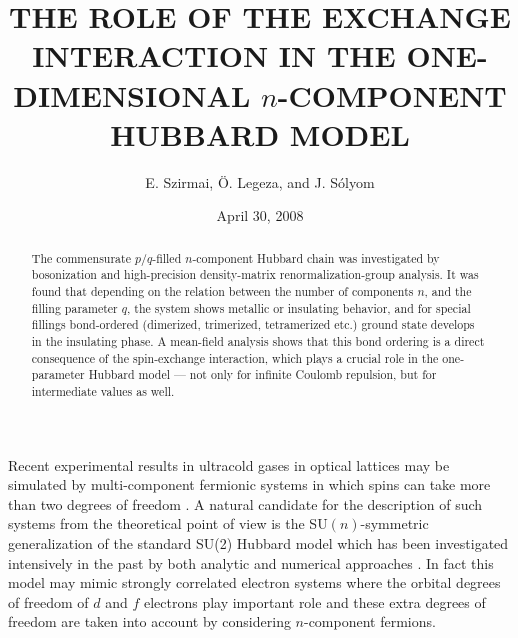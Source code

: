 \documentclass[aps,prb,twocolumn,floatfix,showpacs]{revtex4}
\begin{document}
\title{THE ROLE OF THE EXCHANGE INTERACTION IN THE ONE-DIMENSIONAL
  $n$-COMPONENT HUBBARD MODEL}

\author{E. Szirmai, \"O. Legeza, and J. S\'olyom}


\date{April 30, 2008}

    

\begin{abstract}
  The commensurate $p/q$-filled $n$-component Hubbard chain was investigated
by bosonization and high-precision density-matrix renormalization-group
analysis. It was found that depending on the relation between the number of
components $n$, and the filling parameter $q$, the system shows metallic or
insulating behavior, and for special fillings bond-ordered (dimerized,
trimerized, tetramerized etc.) ground state develops in the insulating
phase. A mean-field analysis shows
that this bond ordering is a direct consequence of the spin-exchange
interaction, which plays a crucial role in the one-parameter Hubbard model ---
not only for infinite Coulomb repulsion, but for intermediate values as well.
\end{abstract}

\maketitle      


Recent experimental results in ultracold gases in optical lattices may be
simulated by multi-component fermionic systems in which spins can take more
than two degrees of freedom \cite{honer}.  A natural candidate for the
description of such systems from the theoretical point of view is the
SU$(n)$-symmetric generalization of the standard SU(2) Hubbard model
\cite{Hubb1-4} which has been investigated intensively in the past by both
analytic and numerical approaches
\cite{honer,marston,assaraf,assaad,szirmai01,LSS,BLSS,rapp,zhao}. In fact this
model may mimic strongly correlated electron systems where the orbital degrees
of freedom of $d$ and $f$ electrons play important role and these extra
degrees of freedom are taken into account by considering $n$-component
fermions.
\end{document}
